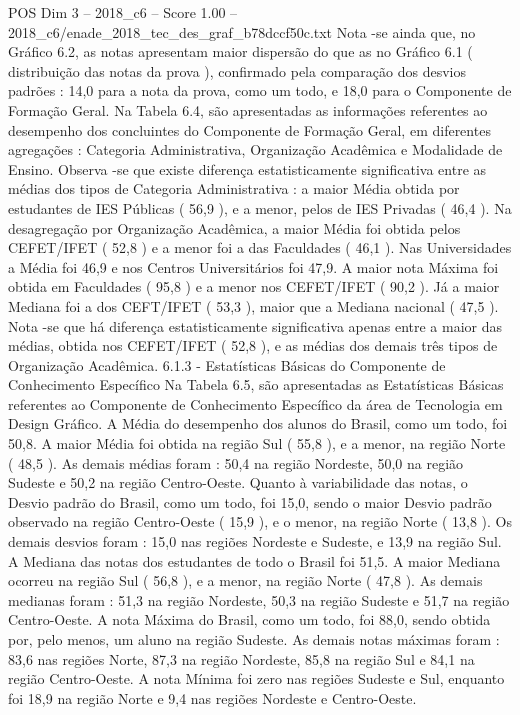 \begin{textsample}{POS Dim 3 – 2018\_c6 – Score 1.00 – 2018\_c6/enade\_2018\_tec\_des\_graf\_b78dccf50c.txt}
Nota -se ainda que, no Gráfico 6.2, as notas apresentam maior dispersão do que as no Gráfico 6.1 ( distribuição das notas da prova ), confirmado pela comparação dos desvios padrões : 14,0 para a nota da prova, como um todo, e 18,0 para o Componente de Formação Geral.
Na Tabela 6.4, são apresentadas as informações referentes ao desempenho dos concluintes do Componente de Formação Geral, em diferentes agregações : Categoria Administrativa, Organização Acadêmica e Modalidade de Ensino.
Observa -se que existe diferença estatisticamente significativa entre as médias dos tipos de Categoria Administrativa : a maior Média obtida por estudantes de IES Públicas ( 56,9 ), e a menor, pelos de IES Privadas ( 46,4 ).
Na desagregação por Organização Acadêmica, a maior Média foi obtida pelos CEFET/IFET ( 52,8 ) e a menor foi a das Faculdades ( 46,1 ).
Nas Universidades a Média foi 46,9 e nos Centros Universitários foi 47,9.
A maior nota Máxima foi obtida em Faculdades ( 95,8 ) e a menor nos CEFET/IFET ( 90,2 ).
Já a maior Mediana foi a dos CEFT/IFET ( 53,3 ), maior que a Mediana nacional ( 47,5 ).
Nota -se que há diferença estatisticamente significativa apenas entre a maior das médias, obtida nos CEFET/IFET ( 52,8 ), e as médias dos demais três tipos de Organização Acadêmica. 6.1.3 - Estatísticas Básicas do Componente de Conhecimento Específico Na Tabela 6.5, são apresentadas as Estatísticas Básicas referentes ao Componente de Conhecimento Específico da área de Tecnologia em Design Gráfico.
A Média do desempenho dos alunos do Brasil, como um todo, foi 50,8.
A maior Média foi obtida na região Sul ( 55,8 ), e a menor, na região Norte ( 48,5 ).
As demais médias foram : 50,4 na região Nordeste, 50,0 na região Sudeste e 50,2 na região Centro-Oeste.
Quanto à variabilidade das notas, o Desvio padrão do Brasil, como um todo, foi 15,0, sendo o maior Desvio padrão observado na região Centro-Oeste ( 15,9 ), e o menor, na região Norte ( 13,8 ).
Os demais desvios foram : 15,0 nas regiões Nordeste e Sudeste, e 13,9 na região Sul.
A Mediana das notas dos estudantes de todo o Brasil foi 51,5.
A maior Mediana ocorreu na região Sul ( 56,8 ), e a menor, na região Norte ( 47,8 ).
As demais medianas foram : 51,3 na região Nordeste, 50,3 na região Sudeste e 51,7 na região Centro-Oeste.
A nota Máxima do Brasil, como um todo, foi 88,0, sendo obtida por, pelo menos, um aluno na região Sudeste.
As demais notas máximas foram : 83,6 nas regiões Norte, 87,3 na região Nordeste, 85,8 na região Sul e 84,1 na região Centro-Oeste.
A nota Mínima foi zero nas regiões Sudeste e Sul, enquanto foi 18,9 na região Norte e 9,4 nas regiões Nordeste e Centro-Oeste.

\end{textsample}
